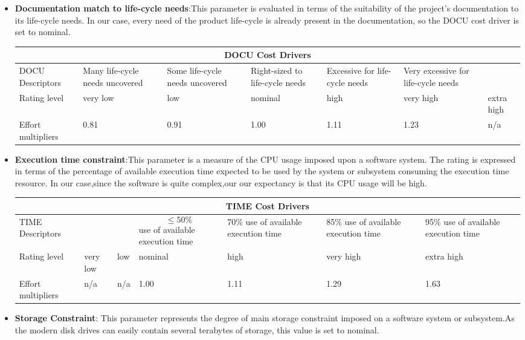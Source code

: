 \begin{itemize}
\item \textbf{Documentation match to life-cycle needs}:This parameter is evaluated in terms of the suitability of the project's documentation to its life-cycle needs. In our case, every need
of the product life-cycle is already present in the documentation,
so the DOCU cost driver is set to nominal.

\begin{longtable}{| m{}| m{} | m{} | m{} | m{} | m{} | m{}| }
\hline
\multicolumn{7}{c}{DOCU Cost Drivers}\\
\hline
\hline
DOCU Descriptors & Many life-cycle needs uncovered & Some life-cycle needs uncovered & Right-sized to life-cycle needs & Excessive for life-cycle needs & Very excessive for life-cycle needs & \\
\hline
Rating level & very low & low & nominal & high & very high & extra high \\
\hline
Effort multipliers & 0.81 & 0.91 & 1.00 & 1.11 & 1.23 & n/a \\
\hline
\end{longtable}

\item \textbf{Execution time constraint}:This parameter is a measure of the CPU usage imposed upon a software system. The rating is expressed in terms of the percentage of available execution time expected to be used by the system or subsystem consuming the execution time resource. In our case,since the software is quite complex,our our expectancy is that its CPU usage will be high.

\begin{longtable}{| m{}| m{} | m{} | m{} | m{} | m{} | m{}| }
\hline
\multicolumn{7}{c}{TIME Cost Drivers}\\
\hline
\hline
TIME Descriptors &  &  & \begin{equation*}
{\le 50\%} 
\end{equation*} use of available execution time & 70\% use of available execution time & 85\% use of available execution time & 95\% use of available execution time \\
\hline
Rating level & very low & low & nominal & high & very high & extra high \\
\hline
Effort multipliers & n/a & n/a & 1.00 & 1.11 & 1.29 & 1.63 \\
\hline
\end{longtable}

\item \textbf{Storage Constraint}: This parameter represents the degree of main storage constraint imposed on a software system or subsystem.As the modern disk drives can easily contain several terabytes of storage, this value is set to nominal.


\end{itemize}
